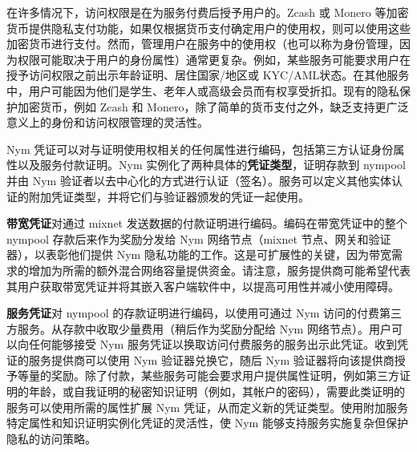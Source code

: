 \documentclass{article}
\begin{document}
	
	在许多情况下，访问权限是在为服务付费后授予用户的。Zcash \cite{ref92} 或 Monero \cite{ref82} 等加密货币提供隐私支付功能，如果仅根据货币支付确定用户的使用权，则可以使用这些加密货币进行支付。然而，管理用户在服务中的使用权（也可以称为身份管理，因为权限可能取决于用户的身份属性）通常更复杂。例如，某些服务可能要求用户在授予访问权限之前出示年龄证明、居住国家/地区或 KYC/AML状态。在其他服务中，用户可能因为他们是学生、老年人或高级会员而有权享受折扣。现有的隐私保护加密货币，例如 Zcash 和 Monero，除了简单的货币支付之外，缺乏支持更广泛意义上的身份和访问权限管理的灵活性。\newline

	Nym 凭证可以对与证明使用权相关的任何属性进行编码，包括第三方认证身份属性以及服务付款证明。Nym 实例化了两种具体的\textbf{凭证类型}，证明存款到 nympool 并由 Nym 验证者以去中心化的方式进行认证（签名）。服务可以定义其他实体认证的附加凭证类型，并将它们与验证器颁发的凭证一起使用。\newline

	\textbf{带宽凭证}对通过 mixnet 发送数据的付款证明进行编码。编码在带宽凭证中的整个 nympool 存款后来作为奖励分发给 Nym 网络节点（mixnet 节点、网关和验证器），以表彰他们提供 Nym 隐私功能的工作。这是可扩展性的关键，因为带宽需求的增加为所需的额外混合网络容量提供资金。请注意，服务提供商可能希望代表其用户获取带宽凭证并将其嵌入客户端软件中，以提高可用性并减小使用障碍。\newline

	\textbf{服务凭证}对 nympool 的存款证明进行编码，以使用可通过 Nym 访问的付费第三方服务。从存款中收取少量费用（稍后作为奖励分配给 Nym 网络节点）。用户可以向任何能够接受 Nym 服务凭证以换取访问付费服务的服务出示此凭证。收到凭证的服务提供商可以使用 Nym 验证器兑换它，随后 Nym 验证器将向该提供商授予等量的奖励。除了付款，某些服务可能会要求用户提供属性证明，例如第三方证明的年龄，或自我证明的秘密知识证明（例如，其帐户的密码），需要此类证明的服务可以使用所需的属性扩展 Nym 凭证，从而定义新的凭证类型。使用附加服务特定属性和知识证明实例化凭证的灵活性，使 Nym 能够支持服务实施复杂但保护隐私的访问策略。\newline
\end{document}
